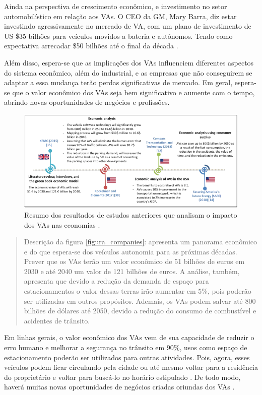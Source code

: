 Ainda na perspectiva de crescimento econômico, e investimento no setor automobilístico em relação aos VAs. O CEO da GM, Mary Barra, diz estar investindo agressivamente no mercado de VA, com um plano de investimento de US \$35 bilhões para veículos movidos a bateria e autônomos. Tendo como expectativa arrecadar \$50 bilhões até o final da década \cite{gm}.

Além disso, espera-se que as implicações dos VAs influenciem diferentes aspectos do sistema econômico, além do industrial, e as empresas que não conseguirem se adaptar a essa mudança terão perdas significativas de mercado. Em geral, espera-se que o valor econômico dos VAs seja bem significativo e aumente com o tempo, abrindo novas oportunidades de negócios e profissões.

\begin{figure}[H]
\centering
\includegraphics[width=\textwidth]{Figures/vas-mercado.png}
\caption{Resumo dos resultados de estudos anteriores que analisam o impacto dos VAs nas economias \cite{mundobrasil}.}
\label{figura_resumo}
\end{figure}

\begin{quote}
Descrição da figura \ref{figura_companies}: apresenta um panorama econômico e do que espera-se dos veículos autonomia para as próximas décadas. Prever que os VAs terão um valor econômico de 51 bilhões de euros em 2030 e até 2040 um valor de 121 bilhões de euros. A análise, também, apresenta que devido a redução da demanda de espaço para estacionamentos o valor dessas terras irão aumentar em 5\%, pois poderão ser utilizadas em outros propósitos. Ademais, os VAs podem salvar até 800 bilhões de dólares até 2050, devido a redução do consumo de combustível e acidentes de trânsito. 
\end{quote}

Em linhas gerais, o valor econômico dos VAs vem de sua capacidade de reduzir o erro humano e melhorar a segurança no trânsito em 90\%, usos como espaço de estacionamento poderão ser utilizados para outras atividades. Pois, agora, esses veículos podem ficar circulando pela cidade ou até mesmo voltar para a residência do proprietário e voltar para buscá-lo no horário estipulado \cite{4cenarios_ocidental}. De todo modo, haverá muitas novas oportunidades de negócios criadas oriundas dos VAs \cite{mundobrasil}.




